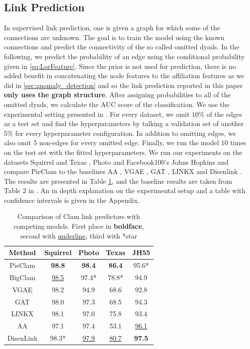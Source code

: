 \documentclass[letterpaper]{article} %
\begin{document}
\begingroup
\color{blue}
\subsection{Link Prediction}
In supervised link prediction, one is given a graph for which some of the connections are unknown. The goal is to train the model using the known connections and predict the connectivity of the so called omitted dyads. In the following, we predict the probability of an edge using the conditional probability given in \ref{eq:LorFeature}. Since the prior is not used for prediction, there is no added benefit in concatenating the node features to the affiliation features as we did in \ref{sec:anomaly_detection} and so the link prediction reported in this paper \textbf{only uses the graph structure}. After assigning probabilities to all of the omitted dyads, we calculate the AUC score of the classification.
We use the experimental setting presented in \cite{zhou2022disenlink}. For every dataset, we omit $10\%$ of the edges as a test set and find the hyperparameters by talking a validation set of another $5\%$ for every hyperparameter configuration. In addition to omitting edges, we also omit 5 non-edges for every omitted edge. Finally, we run the model $10$ times on the test set with the fitted hyperparameters. We run our experiments on the datasets Squirrel and Texas \cite{pei2020texasquirrel}, Photo \cite{shchur2018photo} and Facebook100's Johns Hopkins \cite{lim2021hopkins} and compare PieClam to the baselines AA \cite{adamic2003friends}, VGAE \cite{kipf2016variational}, GAT \cite{GAT}, LINKX \cite{lim2021linkx} and Disenlink \cite{zhou2022disenlink}. The results are presented in Table \ref{table: link table}, and the baseline results are taken from Table 2 in \cite{zhou2022disenlink}. An in depth explanation on the experimental setup and a table with confidence intervals is given in the Appendix.
\begin{table}[t]
    \centering
    \begin{tabular}{|c|c|c|c|c|}
        \hline
        Method  & Squirrel& Photo & Texas & JH55 \\
        \hline
        PieClam & \textbf{98.8} & \textbf{98.4} &   \textbf{86.4}           & 95.6*     \\
        \hline
        BigClam & \underline{98.5}& 97.4*  & 78.8*& 94.9 \\
        VGAE    &   98.2   &94.9  & 68.6 & 92.8 \\
        GAT     &   98.0   &97.3  & 68.5 &   94.3\\
        LINKX   &   98.1   &97.0  & 75.8 &   93.4 \\
        AA      &   97.1 &97.4  & 53.1 &  \underline{96.1}  \\
        DisenLink & 98.3* & \underline{97.9} & \underline{80.7} &   \textbf{97.5} \\
        \hline
    \end{tabular}
    \caption{Comparison of Clam link predictors with competing models. First place in \textbf{boldface}, second with \underline{underline}, third with *star}
    \label{table: link table}
\end{table}
\end{document}
